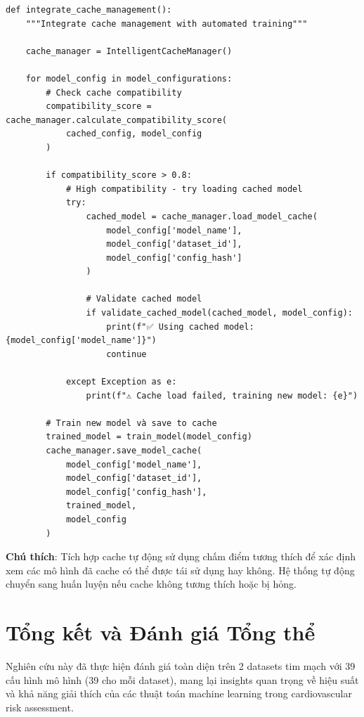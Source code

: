\begin{verbatim}
def integrate_cache_management():
    """Integrate cache management with automated training"""
    
    cache_manager = IntelligentCacheManager()
    
    for model_config in model_configurations:
        # Check cache compatibility
        compatibility_score = cache_manager.calculate_compatibility_score(
            cached_config, model_config
        )
        
        if compatibility_score > 0.8:
            # High compatibility - try loading cached model
            try:
                cached_model = cache_manager.load_model_cache(
                    model_config['model_name'],
                    model_config['dataset_id'],
                    model_config['config_hash']
                )
                
                # Validate cached model
                if validate_cached_model(cached_model, model_config):
                    print(f"✅ Using cached model: {model_config['model_name']}")
                    continue
                    
            except Exception as e:
                print(f"⚠️ Cache load failed, training new model: {e}")
        
        # Train new model và save to cache
        trained_model = train_model(model_config)
        cache_manager.save_model_cache(
            model_config['model_name'],
            model_config['dataset_id'],
            model_config['config_hash'],
            trained_model,
            model_config
        )
\end{verbatim}

\textbf{Chú thích}: Tích hợp cache tự động sử dụng chấm điểm tương thích để xác định xem các mô hình đã cache có thể được tái sử dụng hay không. Hệ thống tự động chuyển sang huấn luyện nếu cache không tương thích hoặc bị hỏng.

\section{Tổng kết và Đánh giá Tổng thể}

\noindent
Nghiên cứu này đã thực hiện đánh giá toàn diện trên 2 datasets tim mạch với 39 cấu hình mô hình (39 cho mỗi dataset), mang lại insights quan trọng về hiệu suất và khả năng giải thích của các thuật toán machine learning trong cardiovascular risk assessment.

